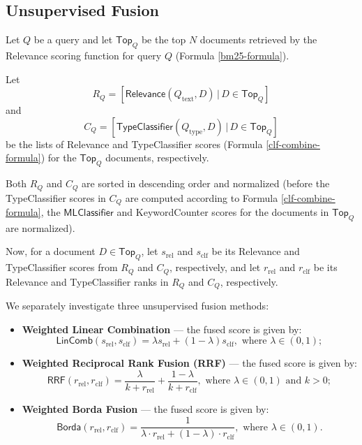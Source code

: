 \subsection{Unsupervised Fusion}\label{unsup-fusion-theory}
Let $Q$ be a query and let $\textsf{Top}_Q$ be the top $N$ documents retrieved by the \textsf{Relevance}
scoring function for query $Q$ (Formula \ref{bm25-formula}).

Let
\[R_Q = [\textsf{Relevance}(Q_{\text{text}}, D) \,|\, D\in \textsf{Top}_Q]\]
and
\[C_Q = [\textsf{TypeClassifier}(Q_{\text{type}}, D) \,|\, D\in \textsf{Top}_Q]\]
be the lists of \textsf{Relevance} and
\textsf{TypeClassifier} scores (Formula \ref{clf-combine-formula})
for the $\textsf{Top}_Q$ documents, respectively.

Both $R_Q$ and $C_Q$ are sorted in descending order and normalized
(before the \textsf{TypeClassifier} scores in $C_Q$ are computed according to Formula \ref{clf-combine-formula}, the
$\textsf{MLClassifier}$ and \textsf{KeywordCounter} scores for the documents in $\textsf{Top}_Q$ are normalized).

Now, for a document $D\in \textsf{Top}_Q$, let $s_{\text{rel}}$ and $s_{\text{clf}}$ be its \textsf{Relevance} and \textsf{TypeClassifier}
scores from $R_Q$ and $C_Q$, respectively,
and let
$r_{\text{rel}}$ and $r_{\text{clf}}$ be its \textsf{Relevance} and \textsf{TypeClassifier} ranks in $R_Q$ and $C_Q$, respectively.

We separately investigate three unsupervised fusion methods:
\begin{itemize}

 \item \textbf{Weighted Linear Combination} \cite{borda} --- the fused score is given by:
 \begin{equation} \label{interp-formula}
 \textsf{LinComb}(s_{\text{rel}}, s_{\text{clf}}) =
	      \lambda s_{\text{rel}} + (1-\lambda) s_{\text{clf}}, \text{ where } \lambda \in (0,1);
 \end{equation}

\item \textbf{Weighted Reciprocal Rank Fusion (RRF)} \cite{rrf} --- the fused score is given by:
 \begin{equation}\label{rrf-formula}
  \textsf{RRF}(r_{\text{rel}}, r_{\text{clf}}) =
	      \displaystyle\frac{\lambda}{k + r_{\text{rel}}} + \displaystyle\frac{1- \lambda}{k + r_{\text{clf}}},  \text{ where } \lambda \in (0,1)
  \text{ and } k>0;
 \end{equation}

 \item \textbf{Weighted Borda Fusion} \cite{borda} ---  the fused score is given by:
 \begin{equation}\label{borda-formula}
   \textsf{Borda}(r_{\text{rel}}, r_{\text{clf}}) =
	    \displaystyle\frac{1}{\lambda \cdot r_{\text{rel}} + (1-\lambda)\cdot r_{\text{clf}}},  \text{ where } \lambda \in (0,1).
 \end{equation}
  \end{itemize}

